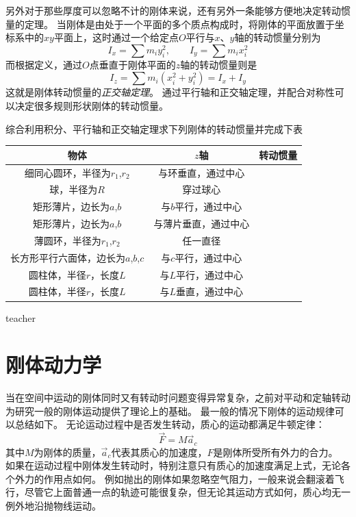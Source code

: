 另外对于那些厚度可以忽略不计的刚体来说，还有另外一条能够方便地决定转动惯量的定理。
当刚体是由处于一个平面的多个质点构成时，将刚体的平面放置于坐标系中的$xy$平面上，这时通过一个给定点$O$平行与$x$、$y$轴的转动惯量分别为
\[I_x = \sum m_i y_i^2,\qquad I_y = \sum m_i x_i^2\]
而根据定义，通过$O$点垂直于刚体平面的$z$轴的转动惯量则是
\begin{equation}
I_z  = \sum m_i(x_i^2+y_i^2) = I_x+I_y
\end{equation}
这就是刚体转动惯量的\emph{正交轴定理}。
通过平行轴和正交轴定理，并配合对称性可以决定很多规则形状刚体的转动惯量。

\begin{example}
综合利用积分、平行轴和正交轴定理求下列刚体的转动惯量并完成下表





\begin{tabular}{|c|c|c|}
\hline 
物体 & $z$轴 & 转动惯量 \\ 
\hline 
细同心圆环，半径为$r_1$,$r_2$ & 与环垂直，通过中心 &  	 \\ 
\hline 
球，半径为$R$ & 穿过球心 &   \\ 
\hline 
矩形薄片，边长为$a$,$b$ & 与$b$平行，通过中心 &   \\ 
\hline 
矩形薄片，边长为$a$,$b$ & 与薄片垂直，通过中心 &   \\ 
\hline 
薄圆环，半径为$r_1$,$r_2$ & 任一直径 &  \\ 
\hline 
长方形平行六面体，边长为$a$,$b$,$c$&  与$c$平行，通过中心 &    \\ 
\hline 
圆柱体，半径$r$，长度$L$&  与$L$平行，通过中心 &    \\ 
\hline
圆柱体，半径$r$，长度$L$&  与$L$垂直，通过中心 &    \\ 
\hline
\end{tabular} 


\begin{taggedblock}{teacher}

\end{taggedblock}
\end{example}

\section{刚体动力学}
当在空间中运动的刚体同时又有转动时问题变得异常复杂，之前对平动和定轴转动为研究一般的刚体运动提供了理论上的基础。
最一般的情况下刚体的运动规律可以总结如下。
无论运动过程中是否发生转动，质心的运动都满足牛顿定律：
\begin{equation}
\vec{F} = M\vec{a}_c
\end{equation}
其中$M$为刚体的质量，$\vec{a}_c$代表其质心的加速度，$F$是刚体所受所有外力的合力。
如果在运动过程中刚体发生转动时，特别注意只有质心的加速度满足上式，无论各个外力的作用点如何。
例如抛出的刚体如果忽略空气阻力，一般来说会翻滚着飞行，尽管它上面普通一点的轨迹可能很复杂，但无论其运动方式如何，质心均无一例外地沿抛物线运动。

